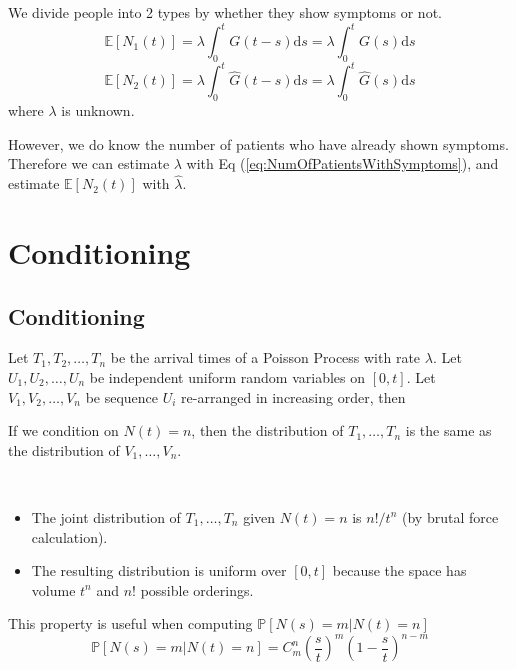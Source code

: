         We divide people into 2 types by whether they show symptoms or not.
        \begin{equation}\label{eq:NumOfPatientsWithSymptoms} \mathbb{E}[N_1(t)] = \lambda \int_0^t G(t-s)\mathrm{d}s = \lambda\int_0^t G(s)\mathrm{d}s \end{equation}
        \[ \mathbb{E}[N_2(t)] = \lambda \int_0^t \hat{G}(t-s)\mathrm{d}s = \lambda\int_0^t \hat{G}(s)\mathrm{d}s \]
        where $\lambda$ is unknown.

        However, we do know the number of patients who have already shown symptoms. Therefore we can estimate $\lambda$ with Eq (\ref{eq:NumOfPatientsWithSymptoms}), and estimate $\mathbb{E}[N_2(t)]$ with $\hat{\lambda}$.

\section{Conditioning}

    \subsection{Conditioning}
        Let $T_1, T_2, \dots, T_n$ be the arrival times of a Poisson Process with rate $\lambda$. Let $U_1, U_2, \dots, U_n$ be independent uniform random variables on $[0,t]$. Let $V_1, V_2, \dots, V_n$ be sequence $U_i$ re-arranged in increasing order, then
        \begin{theorem}[Conditioning]\label{thm:ConditioningOfPoissonProcess}
            If we condition on $N(t)=n$, then the distribution of $T_1, \dots, T_n$ is the same as the distribution of $V_1, \dots, V_n$.
        \end{theorem}
        \begin{sketchproof}~{}
            \begin{itemize}
                \item The joint distribution of $T_1,\dots,T_n$ given $N(t)=n$ is $n!/t^n$ (by brutal force calculation).
                \item The resulting distribution is uniform over $[0,t]$ because the space has volume $t^n$ and $n!$ possible orderings.
            \end{itemize}
        \end{sketchproof}
        \begin{remark}
            This property is useful when computing $\mathbb{P}[N(s)=m|N(t)=n]$
            \[ \mathbb{P}[N(s)=m|N(t)=n] = C^n_m \left(\frac{s}{t}\right)^m\left(1-\frac{s}{t}\right)^{n-m} \]
        \end{remark}


